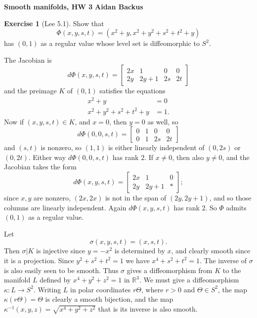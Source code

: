 \documentclass[10pt]{article}
\newcommand{\RR}{\mathbb{R}}
\theoremstyle{definition}
\newtheorem{exer}{Exercise}
\begin{document}
\noindent
\large\textbf{Smooth manifolds, HW 3} \hfill \textbf{Aidan Backus} \\


\begin{exer}[Lee 5.1]
Show that
$$\Phi(x, y, s, t) = (x^2 + y, x^2 + y^2 + s^2 + t^2 + y)$$
has $(0, 1)$ as a regular value whose level set is diffeomorphic to $S^2$.
\end{exer}

The Jacobian is
$$d\Phi(x, y, s, t) = \begin{bmatrix} 2x & 1 & 0 & 0 \\ 2y & 2y + 1 & 2s & 2t \end{bmatrix}$$
and the preimage $K$ of $(0, 1)$ satisfies the equations
\begin{align*}
x^2 + y &= 0 \\
x^2 + y^2 + s^2 + t^2 + y &= 1.
\end{align*}
Now if $(x, y, s, t) \in K$, and $x = 0$, then $y = 0$ as well, so
$$d\Phi(0, 0, s, t) = \begin{bmatrix} 0 & 1 & 0 & 0 \\ 0 & 1 & 2s & 2t \end{bmatrix}$$
and $(s, t)$ is nonzero, so $(1, 1)$ is either linearly independent of $(0, 2s)$ or $(0, 2t)$.
Either way $ d\Phi(0, 0, s, t) $ has rank $2$.
If $x \neq 0$, then also $y \neq 0$, and the Jacobian takes the form
$$d\Phi(x, y, s, t) = \begin{bmatrix} 2x & 1 & 0 \\ 2y & 2y + 1 & * \end{bmatrix};$$
since $x,y$ are nonzero, $(2x, 2x)$ is not in the span of $(2y, 2y+1)$, and so those columns are linearly independent.
Again $d\Phi(x, y, s, t)$ has rank $2$. So $\Phi$ admits $(0, 1)$ as a regular value.

Let
$$\sigma(x, y, s, t) = (x, s, t).$$
Then $\sigma|K$ is injective since $y = -x^2$ is determined by $x$, and clearly smooth since it is a projection.
Since $y^2 + s^2 + t^2 = 1$ we have $x^4 + s^2 + t^2 = 1$.
The inverse of $\sigma$ is also easily seen to be smooth.
Thus $\sigma$ gives a diffeomorphism from $K$ to the manifold $L$ defined by $x^4 + y^2 + z^2 = 1$ in $\RR^3$.
We must give a diffeomorphism $\kappa: L \to S^2$. Writing $L$ in polar coordinates $r\Theta$, where $r > 0$ and $\Theta \in S^2$, the map $\kappa(r\Theta)= \Theta$ is clearly a smooth bijection, and the map $\kappa^{-1}(x, y, z) = \sqrt{x^4 + y^2 + z^2}$ that is its inverse is also smooth.
\end{document}
